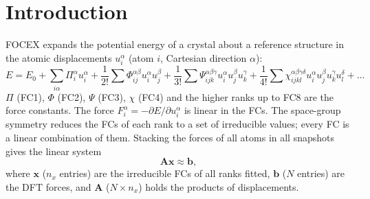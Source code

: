 \documentclass[11pt,a4paper]{article}
\newcommand{\bA}{\mathbf A}
\newcommand{\bx}{\mathbf x}
\newcommand{\bb}{\mathbf b}
\begin{document}
\section{Introduction}
FOCEX expands the potential energy of a crystal about a reference structure in the atomic
displacements $u_i^\alpha$ (atom $i$, Cartesian direction $\alpha$):
\begin{equation}
E=E_0+\sum_{i\alpha}\Pi_i^\alpha u_i^\alpha+\frac1{2!}\sum\Phi_{ij}^{\alpha\beta}u_i^\alpha u_j^\beta
+\frac1{3!}\sum\Psi_{ijk}^{\alpha\beta\gamma}u_i^\alpha u_j^\beta u_k^\gamma
+\frac1{4!}\sum\chi_{ijkl}^{\alpha\beta\gamma\delta}u_i^\alpha u_j^\beta u_k^\gamma u_l^\delta+\dots
\label{eq:taylor}
\end{equation}
$\Pi$ (FC1), $\Phi$ (FC2), $\Psi$ (FC3), $\chi$ (FC4) and the higher ranks up to FC8 are the force
constants. The force $F_i^\alpha=-\partial E/\partial u_i^\alpha$ is linear in the FCs. The space-group
symmetry reduces the FCs of each rank to a set of irreducible values; every FC is a linear combination of
them. Stacking the forces of all atoms in all snapshots gives the linear system
\begin{equation}
\bA\bx\approx\bb ,
\end{equation}
where $\bx$ ($n_x$ entries) are the irreducible FCs of all ranks fitted, $\bb$ ($N$ entries) are the DFT
forces, and $\bA$ ($N\times n_x$) holds the products of displacements.
\end{document}
